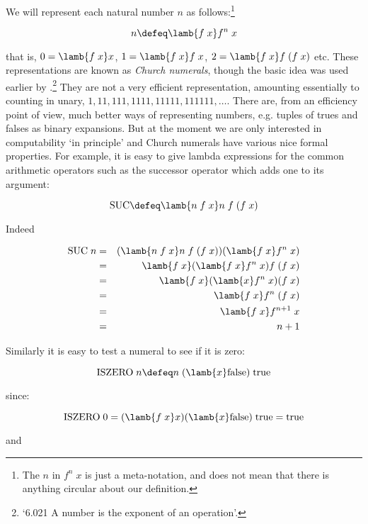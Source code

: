 We will represent each natural number $n$ as follows:\footnote{The $n$ in
$f^n\; x$ is just a meta-notation, and does not mean that there is anything
circular about our definition.}

$$ n \defeq \lamb{f\; x} f^n\; x $$

\noindent that is, $0 = \lamb{f\; x} x$, $1 = \lamb{f\; x} f\; x$, $2 =
\lamb{f\; x} f\;(f\; x)$ etc. These representations are known as {\em Church
numerals}, though the basic idea was used earlier by
.\footnote{`6.021 A number is the exponent of an
operation'.} They are not a very efficient representation, amounting
essentially to counting in unary, $1, 11, 111, 1111, 11111, 111111, \ldots$.
There are, from an efficiency point of view, much better ways of representing
numbers, e.g. tuples of trues and falses as binary expansions. But at the
moment we are only interested in computability `in principle' and Church
numerals have various nice formal properties. For example, it is easy to give
lambda expressions for the common arithmetic operators such as the successor
operator which adds one to its argument:

$$ \mbox{SUC} \defeq \lamb{n\; f\; x} n\; f\; (f\; x) $$

\noindent Indeed

\begin{eqnarray*}
\mbox{SUC}\; n & = & (\lamb{n\; f\; x} n\; f\; (f\; x)) (\lamb{f\; x} f^n\; x)  \\
             & = & \lamb{f\; x} (\lamb{f\; x} f^n\; x) f\; (f\; x)          \\
             & = & \lamb{f\; x} (\lamb{x} f^n\; x) (f\; x)                \\
             & = & \lamb{f\; x} f^n\; (f\; x)                                \\
             & = & \lamb{f\; x} f^{n + 1}\; x                               \\
             & = & n + 1
\end{eqnarray*}

\noindent Similarly it is easy to test a numeral to see if it is zero:

$$ \mbox{ISZERO}\; n \defeq n\; (\lamb{x} \mbox{false})\; \mbox{true} $$

\noindent since:

$$ \mbox{ISZERO}\; 0 = (\lamb{f\; x} x) (\lamb{x} \mbox{false})\; \mbox{true}
                     = \mbox{true} $$

\noindent and

